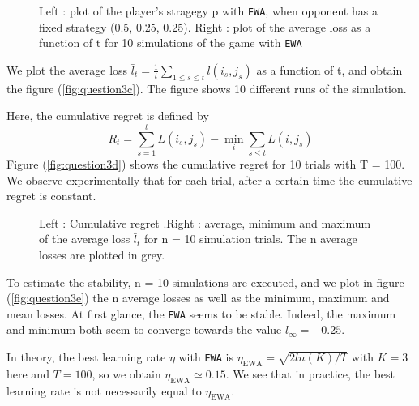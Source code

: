 \begin{figure}
	
	\qquad
	
	\caption{Left : plot of the player's stragegy p with \texttt{EWA}, when opponent has a fixed strategy (0.5, 0.25, 0.25). Right : plot of the average loss as a function of t for 10 simulations of the game with \texttt{EWA}}
	\label{fig:question3b3c}
\end{figure}

 We plot the average loss $\bar{l}_t = \frac{1}{t} \sum_{1 \leqslant s \leqslant t} l(i_s, j_s)$ as a function of t, and obtain the figure (\ref{fig:question3c}). The figure shows 10 different runs of the simulation.  

 Here, the cumulative regret is defined by 
\begin{equation}
	R_t = \sum_{s = 1}^t L(i_s, j_s) - \underset{i}{\min} \sum_{s \leqslant t}L(i, j_s)
\end{equation}Figure (\ref{fig:question3d}) shows the cumulative regret for 10 trials with T = 100. We observe experimentally that for each trial, after a certain time the cumulative regret is constant. 

\begin{figure}
	\qquad
	\caption{Left : Cumulative regret .Right : average, minimum and maximum of the average loss $\bar{l}_t$ for n = 10 simulation trials. The n average losses are plotted in grey.}
\label{fig:question3d3e}
\end{figure}

 To estimate the stability, n = 10 simulations are executed, and we plot in figure (\ref{fig:question3e}) the n average losses as well as the minimum, maximum and mean losses. At first glance, the \texttt{EWA} seems to be stable. Indeed, the maximum and minimum both seem to converge towards the value $l_\infty = -0.25$.

In theory, the best learning rate $\eta$ with \texttt{EWA} is $\eta_{\text{EWA}} = \sqrt{2 ln(K) / T}$ with $K = 3$ here and $T = 100$, so we obtain $\eta_{\text{EWA}} \simeq 0.15$. We see that in practice, the best learning rate is not necessarily equal to $\eta_{\text{EWA}}$. 

